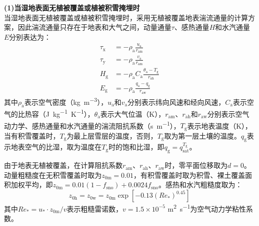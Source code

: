 \textbf {(1)当湿地表面无植被覆盖或植被积雪掩埋时}\\

当湿地表面无植被覆盖或植被积雪掩埋时，采用无植被覆盖地表湍流通量的计算方案，因此湍流通量只存在于地表和大气之间，动量通量$\tau$、感热通量$H$和水汽通量$E$分别表达为：
\begin{align}
  \tau_{\mathrm {x}}  &= -\rho_{\mathrm{a}} \frac{u_{\mathrm{a}}}{r_{\mathrm{am}}} \\
  \tau_{\mathrm {y}}  &= -\rho_{\mathrm{a}} \frac{v_{\mathrm{a}}}{r_{\mathrm{am}}} \\
  H_{\mathrm {g}}  &= -\rho_{\mathrm{a}} C_{\mathrm{a}} \frac{\theta_{\mathrm{a}}-T_{\mathrm {g}} }{r_{\mathrm{ah}}} \\
  E_{\mathrm {g}}  &= -\rho_{\mathrm{a}} \frac{q_{\mathrm{a}}-q_{\mathrm {g}} }{r_{\mathrm{aw}}}
\end{align}
其中$\rho_{\mathrm{a}}$表示空气密度（\unit{kg.m^{-3}}），$u_{\mathrm{a}}$和$v_{\mathrm{a}}$分别表示纬向风速和经向风速，$C_{\mathrm{a}}$表示空气的比热容（\unit{J.kg^{-1}.K^{-1}}），$\theta_{\mathrm{a}}$表示大气位温（K），$r_{\mathrm{am}}$、$r_{\mathrm{ah}}$和$r_{\mathrm{aw}}$分别表示空气动力学、感热通量和水汽通量的湍流阻抗系数（\unit{s.m^{-1}}），$T_{\mathrm {g}} $表示地表温度（K），当有积雪覆盖时，$T_{\mathrm {g}} $为最上层雪层的温度，否则，$T_{\mathrm {g}} $取为第一层土壤的温度。$q_{\mathrm {g}} $表示地表空气的比湿，取为温度在$T_{\mathrm {g}} $时的饱和比湿，即$q_{\mathrm {g}} =q^{T_{\mathrm {g}} }_{\mathrm{sat}}$。

由于地表无植被覆盖，在计算阻抗系数$r_{\mathrm{am}}$、$r_{\mathrm{ah}}$、$r_{\mathrm{aw}}$时，零平面位移取为$d=0$。动量粗糙度在无积雪覆盖时取为$z_{\mathrm{0m}}=0.01$，有积雪覆盖时取为积雪、裸土覆盖面积加权平均，即$z_{\mathrm{0m}}=0.01 \left(1-f_{\mathrm{sno}}\right)+0.0024 f_{\mathrm{sno}}$。感热和水汽粗糙度取为：
\begin{equation}
  z_{\mathrm{0h}}=z_{\mathrm{0w}}=z_{\mathrm{0m}}\exp{\left[-0.13\left(Re_*\right)^{0.45}\right]}
\end{equation}
其中$Re_*=u_*\cdot z_{\mathrm{0m}}/v$表示粗糙雷诺数，$v= 1.5 \times 10^{-5}$ \unit{m^2.s^{-1}}为空气动力学粘性系数。

